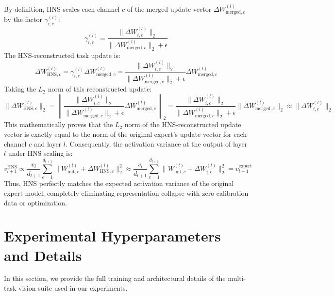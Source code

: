 \documentclass{article}
\theoremstyle{plain}
\theoremstyle{definition}
\theoremstyle{remark}
\begin{document}
By definition, HNS scales each channel $c$ of the merged update vector $\Delta W_{\text{merged}, c}^{(l)}$ by the factor $\gamma_{i, c}^{(l)}$:
\begin{equation}
  \gamma_{i, c}^{(l)} = \frac{\|\Delta W_{i, c}^{(l)}\|_2}{\|\Delta W_{\text{merged}, c}^{(l)}\|_2 + \epsilon}
\end{equation}
The HNS-reconstructed task update is:
\begin{equation}
  \Delta W_{\text{HNS}, c}^{(l)} = \gamma_{i, c}^{(l)} \Delta W_{\text{merged}, c}^{(l)} = \frac{\|\Delta W_{i, c}^{(l)}\|_2}{\|\Delta W_{\text{merged}, c}^{(l)}\|_2 + \epsilon} \Delta W_{\text{merged}, c}^{(l)}
\end{equation}
Taking the $L_2$ norm of this reconstructed update:
\begin{equation}
  \|\Delta W_{\text{HNS}, c}^{(l)}\|_2 = \left\| \frac{\|\Delta W_{i, c}^{(l)}\|_2}{\|\Delta W_{\text{merged}, c}^{(l)}\|_2 + \epsilon} \Delta W_{\text{merged}, c}^{(l)} \right\|_2 = \frac{\|\Delta W_{i, c}^{(l)}\|_2}{\|\Delta W_{\text{merged}, c}^{(l)}\|_2 + \epsilon} \|\Delta W_{\text{merged}, c}^{(l)}\|_2 \approx \|\Delta W_{i, c}^{(l)}\|_2
\end{equation}
This mathematically proves that the $L_2$ norm of the HNS-reconstructed update vector is exactly equal to the norm of the original expert's update vector for each channel $c$ and layer $l$. Consequently, the activation variance at the output of layer $l$ under HNS scaling is:
\begin{equation}
  v_{l+1}^{\text{HNS}} \propto \frac{v_l}{d_{l+1}} \sum_{c=1}^{d_{l+1}} \|W_{\text{init}, c}^{(l)} + \Delta W_{\text{HNS}, c}^{(l)}\|_2^2 \approx \frac{v_l}{d_{l+1}} \sum_{c=1}^{d_{l+1}} \|W_{\text{init}, c}^{(l)} + \Delta W_{i, c}^{(l)}\|_2^2 = v_{l+1}^{\text{expert}}
\end{equation}
Thus, HNS perfectly matches the expected activation variance of the original expert model, completely eliminating representation collapse with zero calibration data or optimization.

\section{Experimental Hyperparameters and Details}
\label{app:hyperparams}

In this section, we provide the full training and architectural details of the multi-task vision suite used in our experiments.
\end{document}

